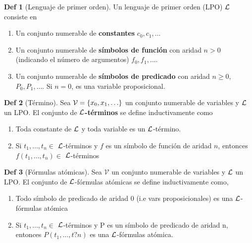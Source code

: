 \documentclass{report}
\theoremstyle{definition} %
\newtheorem*{definition*}{Def}
\begin{document}
\begin{definition*}[Lenguaje de primer orden]
    Un lenguaje de primer orden (LPO) $\mathcal{L}$ consiste en
    \begin{enumerate}
        \item Un conjunto numerable de \textbf{constantes} $c_0, c_1, \dots$
        \item Un conjunto numerable de \textbf{símbolos de función} con aridad
        $n > 0$ (indicando el número de argumentos) $f_0, f_1, \dots$.
        \item Un conjunto numerable de \textbf{símbolos de predicado} con aridad
        $n \geq 0$, $P_0, P_1, \dots$. Si $n = 0$, es una variable
        proposicional.
    \end{enumerate}
\end{definition*}

\begin{definition*}[Término]
    Sea $\mathcal{V} = \set{x_0, x_1, \dots}$ un conjunto numerable de variables
    y $\mathcal{L}$ un LPO. El conjunto de \textbf{$\mathcal{L}$-términos}
    se define inductivamente como

    \begin{enumerate}
        \item Toda constante de $\mathcal{L}$ y toda variable es un $\mathcal{L}$-término.
        \item Si $t_1, \dots, t_n \in$ $\mathcal{L}$-términos y $f$ es un símbolo de
        función de aridad $n$, entonces $f(t_1, \dots, t_n) \in$ $\mathcal{L}$-términos
    \end{enumerate}
\end{definition*}

\begin{definition*}[Fórmulas atómicas]
    Sea $\mathcal{V}$ un conjunto numerable de variables y $\mathcal{L}$ un LPO. El
    conjunto de $\mathcal{L}$-fórmulas atómicas se define inductivamente como,

    \begin{enumerate}
        \item Todo símbolo de predicado de aridad 0 (i.e vars proposicionales)
        es una $\mathcal{L}$-fórmulas atómica
        \item Si $t_1, \dots, t_n \in$ $\mathcal{L}$-términos y P es un símbolo de
        predicado de aridad n, entonces $P(t_1, \dots, t?n)$ es una
        $\mathcal{L}$-fórmulas atómica.
    \end{enumerate}
    
\end{definition*}
\end{document}

